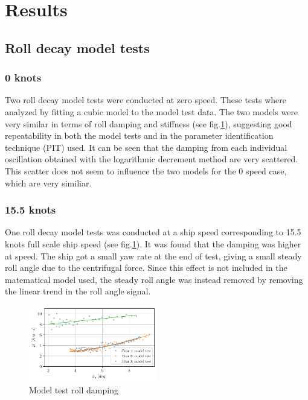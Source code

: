 \section{Results}\label{results}

    \subsection{Roll decay model tests}\label{roll-decay-model-tests}

\subsubsection{0 knots}\label{knots}

Two roll decay model tests were conducted at zero speed.
These tests where analyzed by fitting a cubic model
to the model test data. The two models were very similar in terms of
roll damping and stiffness (see fig.\ref{fig:mdl}), suggesting
good repeatability in both the model tests and in the parameter
identification technique (PIT) used. It can be seen that the damping
from each individual oscillation obtained with the logarithmic decrement
method are very scattered. This scatter does not seem to influence the
two models for the 0 speed case, which are very similiar.

    \subsubsection{15.5 knots}\label{knots}

One roll decay model tests was conducted at a ship speed corresponding
to 15.5 knots full scale ship speed (see fig.\ref{fig:mdl}). It
was found that the damping was higher at speed. The ship got a small yaw
rate
 at the end of test, giving a small steady roll angle due to the
centrifugal force. Since this effect is not included in the matematical
model used, the steady roll angle was instead removed by removing the
linear trend in the roll angle signal.

    

    \begin{figure}[H]
        \begin{center}\includegraphics[width = 0.5\textwidth]{figures/mdl.pdf}\end{center}
        \vspace{-1cm}
        \caption{Model test roll damping}
        \label{fig:mdl}
    \end{figure}
    
